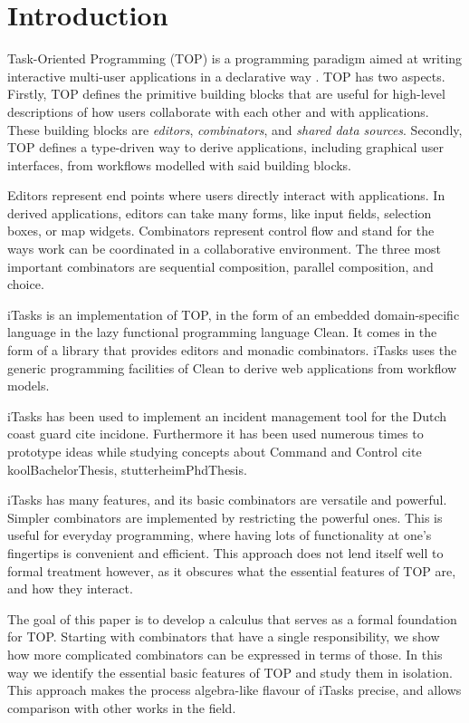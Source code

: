 
\section{Introduction}

Task-Oriented Programming (TOP) is a programming paradigm aimed at writing interactive multi-user applications in a declarative way \cite{conf/ppdp/PlasmeijerLMAK12}.
TOP has two aspects.
Firstly, TOP defines the primitive building blocks that are useful for high-level descriptions of how users collaborate with each other and with applications.
These building blocks are \emph{editors}, \emph{combinators}, and \emph{shared data sources}.
Secondly, TOP defines a type-driven way to derive applications, including graphical user interfaces, from workflows modelled with said building blocks.

Editors represent end points where users directly interact with applications.
In derived applications, editors can take many forms, like input fields, selection boxes, or map widgets.
Combinators represent control flow and stand for the ways work can be coordinated in a collaborative environment.
The three most important combinators are sequential composition, parallel composition, and choice.

iTasks is an implementation of TOP, in the form of an embedded domain-specific language in the lazy functional programming language Clean.
It comes in the form of a library that provides editors and monadic combinators.
iTasks uses the generic programming facilities of Clean to derive web applications from workflow models.

iTasks has been used to implement an incident management tool for the Dutch coast guard \alert{cite incidone}.
Furthermore it has been used numerous times to prototype ideas while studying concepts about Command and Control \alert{cite koolBachelorThesis, stutterheimPhdThesis}.

iTasks has many features, and its basic combinators are versatile and powerful.
Simpler combinators are implemented by restricting the powerful ones.
This is useful for everyday programming, where having lots of functionality at one's fingertips is convenient and efficient.
This approach does not lend itself well to formal treatment however, as it obscures what the essential features of TOP are, and how they interact.

The goal of this paper is to develop a calculus that serves as a formal foundation for TOP.
Starting with combinators that have a single responsibility, we show how more complicated combinators can be expressed in terms of those.
In this way we identify the essential basic features of TOP and study them in isolation.
This approach makes the process algebra-like flavour of iTasks precise, and allows comparison with other works in the field.
